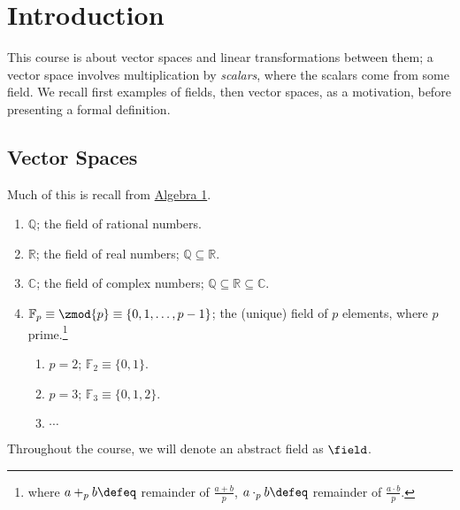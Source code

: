 \section{Introduction}
\begin{remark}
    This course is about vector spaces and linear transformations between them; a vector space involves multiplication by \emph{scalars}, where the scalars come from some field. We recall first examples of fields, then vector spaces, as a motivation, before presenting a formal definition.
\end{remark}

\subsection{Vector Spaces}

\begin{remark}
    Much of this is recall from \href{https://notes.louismeunier.net/Algebra 1/algebra.pdf}{Algebra 1}.
\end{remark}

\begin{example}
    \begin{enumerate}
        \item $\mathbb{Q}$; the field of rational numbers.
        \item $\mathbb{R}$; the field of real numbers; $\mathbb{Q} \subseteq \mathbb{R}$.
        \item $\mathbb{C}$; the field of complex numbers; $\mathbb{Q} \subseteq \mathbb{R} \subseteq \mathbb{C}$.
        \item $\mathbb{F}_p \equiv \zmod{p} \equiv \{0,1, \dots, p-1\}$; the (unique) field of $p$ elements, where $p$ prime.\footnote{where $a +_p b \defeq $ remainder of $\frac{a+b}{p}$, $a \cdot_p b \defeq$ remainder of $\frac{a\cdot b}{p}$.}
        \begin{enumerate}
            \item $p =2$; $\mathbb{F}_2 \equiv \{0, 1\}$.
            \item $p = 3$; $\mathbb{F}_3 \equiv \{0, 1, 2\}$.
            \item $\cdots$
        \end{enumerate}
    \end{enumerate}
\end{example}

\begin{remark}
Throughout the course, we will denote an abstract field as $\field$.
\end{remark}

